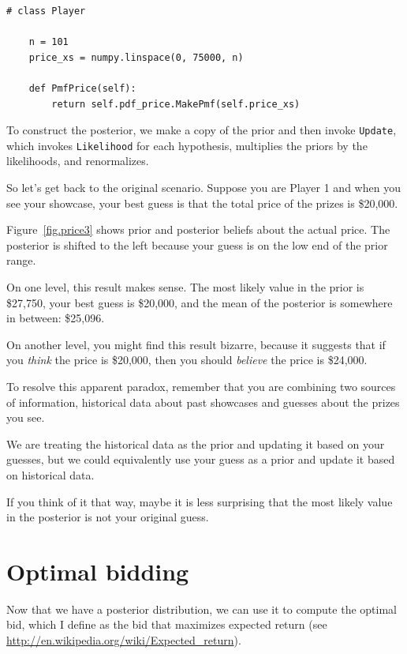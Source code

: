 \documentclass[12pt]{book}
\begin{document}
\begin{verbatim}
# class Player

    n = 101
    price_xs = numpy.linspace(0, 75000, n)

    def PmfPrice(self):
        return self.pdf_price.MakePmf(self.price_xs)
\end{verbatim}

To construct the posterior, we make a copy of the
prior and then invoke {\tt Update}, which invokes {\tt Likelihood}
for each hypothesis, multiplies the priors by the likelihoods,
and  renormalizes.

So let's get back to the original scenario.  Suppose you are
Player 1 and when you see your showcase, your best guess is
that the total price of the prizes is \$20,000.

Figure~\ref{fig.price3} shows prior and
posterior beliefs about the actual price.
The posterior is shifted
to the left because your guess 
is on the low end of the prior range.

On one level, this result makes sense.  The most likely value
in the prior is \$27,750, your best guess is \$20,000, and
the mean of the posterior is somewhere in between: \$25,096.

On another level, you might find this result bizarre, because it
suggests that if you {\em think} the price is \$20,000, then you
should {\em believe} the price is \$24,000.

To resolve this apparent paradox, remember that you are combining two
sources of information, historical data about past showcases and
guesses about the prizes you see.

We are treating the historical data as the prior and updating it
based on your guesses, but we could equivalently use your guess
as a prior and update it based on historical data.  

If you think of it that way, maybe it is less surprising that the
most likely value in the posterior is not your original guess.


\section{Optimal bidding}

Now that we have a posterior distribution, we can use it to
compute the optimal bid, which I define as the bid that maximizes
expected return (see \url{http://en.wikipedia.org/wiki/Expected_return}).
\end{document}
